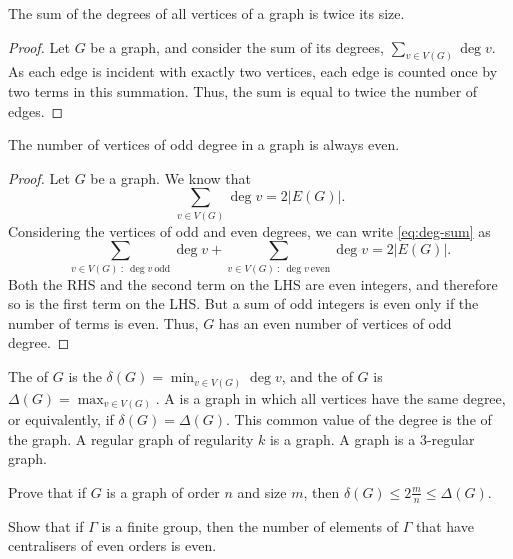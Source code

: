 \begin{Lemma}
The sum of the degrees of all vertices of a graph is twice its size.
\end{Lemma}

\begin{proof}
Let $G$ be a graph, and consider the sum of its degrees, $\sum_{v \in V(G)} \deg v$. As each edge is incident with exactly two vertices, each edge is counted once by two terms in this summation. Thus, the sum is equal to twice the number of edges.
\end{proof}

\begin{Corollary}
The number of vertices of odd degree in a graph is always even.
\end{Corollary}

\begin{proof}
Let $G$ be a graph. We know that
\begin{equation}
\sum_{v \in V(G)} \deg v = 2 |E(G)|. \label{eq:deg-sum}
\end{equation}
Considering the vertices of odd and even degrees, we can write \eqref{eq:deg-sum} as
\begin{equation}
\sum_{v \in V(G) ~:~ \deg v\ \text{odd}} \deg v + \sum_{v \in V(G) ~:~ \deg v\ \text{even}} \deg v = 2 |E(G)|.
\end{equation}
Both the RHS and the second term on the LHS are even integers, and therefore so is the first term on the LHS. But a sum of odd integers is even only if the number of terms is even. Thus, $G$ has an even number of vertices of odd degree.
\end{proof}

The  of $G$ is the $\delta(G) = \min_{v \in V(G)} \deg v$, and the  of $G$ is $\Delta(G) = \max_{v \in V(G)}$. A  is a graph in which all vertices have the same degree, or equivalently, if $\delta(G) = \Delta(G)$. This common value of the degree is the  of the graph. A regular graph of regularity $k$ is a  graph. A  graph is a $3$-regular graph.

\begin{Exercise}
Prove that if $G$ is a graph of order $n$ and size $m$, then $\delta(G) \le 2\frac m n \le \Delta(G)$.
\end{Exercise}

\begin{Exercise}
Show that if $\Gamma$ is a finite group, then the number of elements of $\Gamma$ that have centralisers of even orders is even.
\end{Exercise}

